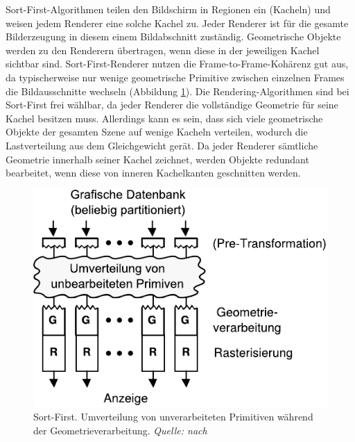 Sort-First-Algorithmen teilen den Bildschirm in Regionen ein (Kacheln) und weisen jedem Renderer eine solche Kachel zu. Jeder Renderer ist für die gesamte Bilderzeugung in diesem einem Bildabschnitt zuständig. Geometrische Objekte werden zu den Renderern übertragen, wenn diese in der jeweiligen Kachel sichtbar sind. Sort-First-Renderer nutzen die Frame-to-Frame-Kohärenz gut aus, da typischerweise nur wenige geometrische Primitive zwischen einzelnen Frames die Bildausschnitte wechseln (Abbildung \ref{fig:relwork:sortfirst}). Die Rendering-Algorithmen sind bei Sort-First frei wählbar, da jeder Renderer die vollständige Geometrie für seine Kachel besitzen muss. Allerdings kann es sein, dass sich viele geometrische Objekte der gesamten Szene auf wenige Kacheln verteilen, wodurch die Lastverteilung aus dem Gleichgewicht gerät. Da jeder Renderer sämtliche Geometrie innerhalb seiner Kachel zeichnet, werden Objekte redundant bearbeitet, wenn diese von inneren Kachelkanten geschnitten werden.
\begin{figure}
 \centering
  \includegraphics[scale=0.8]{images/sort-first.pdf}
  \caption{Sort-First. Umverteilung von unverarbeiteten Primitiven während der Geometrieverarbeitung. \textit{Quelle: nach \cite{molnar}}}
 \label{fig:relwork:sortfirst}
\end{figure}


